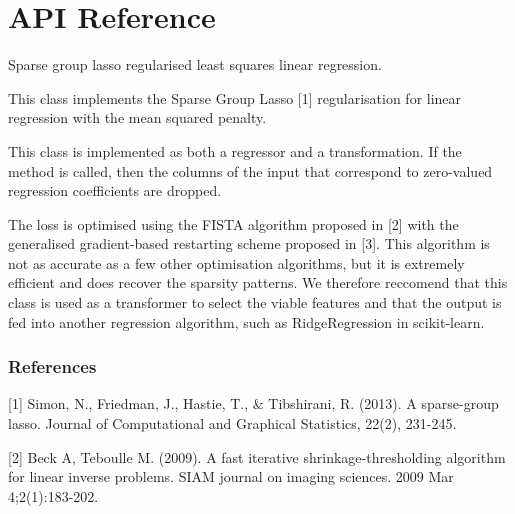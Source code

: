 \documentclass[letterpaper,10pt,english]{sphinxmanual}
\begin{document}
{\section{API Reference}
\label{\detokenize{api_reference:api-reference}}\label{\detokenize{api_reference::doc}}

\begin{fulllineitems}
\label{\detokenize{api_reference:group_lasso.GroupLasso}}
Sparse group lasso regularised least squares linear regression.

This class implements the Sparse Group Lasso {[}1{]} regularisation for
linear regression with the mean squared penalty.

This class is implemented as both a regressor and a transformation.
If the  method is called, then the columns of the input
that correspond to zero-valued regression coefficients are dropped.

The loss is optimised using the FISTA algorithm proposed in {[}2{]} with the
generalised gradient-based restarting scheme proposed in {[}3{]}. This
algorithm is not as accurate as a few other optimisation algorithms,
but it is extremely efficient and does recover the sparsity patterns.
We therefore reccomend that this class is used as a transformer to select
the viable features and that the output is fed into another regression
algorithm, such as RidgeRegression in scikit-learn.
\subsubsection*{References}

{[}1{]} Simon, N., Friedman, J., Hastie, T., \& Tibshirani, R. (2013).
A sparse-group lasso. Journal of Computational and Graphical
Statistics, 22(2), 231-245.

{[}2{]} Beck A, Teboulle M. (2009). A fast iterative shrinkage-thresholding
algorithm for linear inverse problems. SIAM journal on imaging
sciences. 2009 Mar 4;2(1):183-202.


\end{fulllineitems}}
\end{document}

